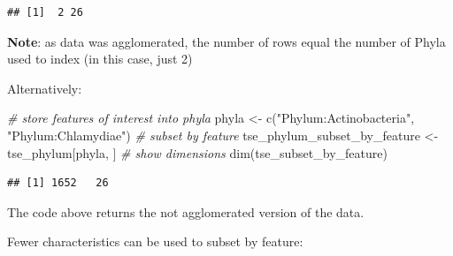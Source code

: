 \documentclass[
]{book}
\newenvironment{Shaded}{\begin{snugshade}}{\end{snugshade}}
\newcommand{\AttributeTok}[1]{\textcolor[rgb]{0.77,0.63,0.00}{#1}}
\newcommand{\CommentTok}[1]{\textcolor[rgb]{0.56,0.35,0.01}{\textit{#1}}}
\newcommand{\FunctionTok}[1]{\textcolor[rgb]{0.00,0.00,0.00}{#1}}
\newcommand{\NormalTok}[1]{#1}
\newcommand{\OtherTok}[1]{\textcolor[rgb]{0.56,0.35,0.01}{#1}}
\newcommand{\SpecialCharTok}[1]{\textcolor[rgb]{0.00,0.00,0.00}{#1}}
\newcommand{\StringTok}[1]{\textcolor[rgb]{0.31,0.60,0.02}{#1}}
\begin{document}
\begin{Shaded}
\end{Shaded}

\begin{verbatim}
## [1]  2 26
\end{verbatim}

\textbf{Note}: as data was agglomerated, the number of rows equal the
number of Phyla used to index (in this case, just 2)

Alternatively:

\begin{Shaded}
\begin{Highlighting}[]
\CommentTok{\# store features of interest into phyla}
\NormalTok{phyla }\OtherTok{\textless{}{-}} \FunctionTok{c}\NormalTok{(}\StringTok{"Phylum:Actinobacteria"}\NormalTok{, }\StringTok{"Phylum:Chlamydiae"}\NormalTok{)}
\CommentTok{\# subset by feature}
\NormalTok{tse\_phylum\_subset\_by\_feature }\OtherTok{\textless{}{-}}\NormalTok{ tse\_phylum[phyla, ]}
\CommentTok{\# show dimensions}
\FunctionTok{dim}\NormalTok{(tse\_subset\_by\_feature)}
\end{Highlighting}
\end{Shaded}

\begin{verbatim}
## [1] 1652   26
\end{verbatim}

The code above returns the not agglomerated version of the data.

Fewer characteristics can be used to subset by feature:
\end{document}
